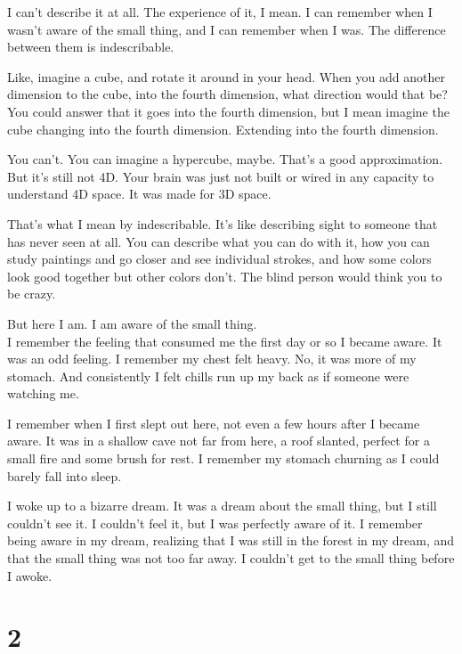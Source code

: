 \documentclass{article}
\begin{document}
I can't describe it at all. The experience of it, I mean. I can remember when I
wasn't aware of the small thing, and I can remember when I was. The difference
between them is indescribable.

Like, imagine a cube, and rotate it around in your head. When you add another
dimension to the cube, into the fourth dimension, what direction would that be?
You could answer that it goes into the fourth dimension, but I mean imagine the
cube changing into the fourth dimension. Extending into the fourth dimension.

You can't. You can imagine a hypercube, maybe. That's a good approximation. But
it's still not 4D. Your brain was just not built or wired in any capacity to
understand 4D space. It was made for 3D space.

That's what I mean by indescribable. It's like describing sight to someone that
has never seen at all. You can describe what you can do with it, how you can
study paintings and go closer and see individual strokes, and how some colors
look good together but other colors don't. The blind person would think you to
be crazy.

But here I am. I am aware of the small thing. \\

\noindent I remember the feeling that consumed me the first day or so I became
aware. It was an odd feeling. I remember my chest felt heavy. No, it was more of
my stomach. And consistently I felt chills run up my back as if someone were
watching me.

I remember when I first slept out here, not even a few hours after I became
aware. It was in a shallow cave not far from here, a roof slanted, perfect for a
small fire and some brush for rest. I remember my stomach churning as I could
barely fall into sleep. 

I woke up to a bizarre dream. It was a dream about the small thing, but I still
couldn't see it. I couldn't feel it, but I was perfectly aware of it. I remember
being aware in my dream, realizing that I was still in the forest in my dream,
and that the small thing was not too far away. I couldn't get to the small thing
before I awoke.



\section*{2}
\end{document}
